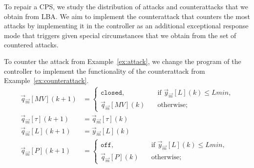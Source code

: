 {To repair a CPS, we study the distribution of attacks and counterattacks that we obtain from LBA. We aim to implement the counterattack that counters the most attacks by implementing it in the controller as an additional exceptional response mode that triggers given special circumstances that we obtain from the set of countered attacks. 
\begin{example}
  To counter the attack from Example~\ref{ex:attack}, we change the program of the controller to implement the functionality of the counterattack from Example~\ref{ex:counterattack}.
\begin{align}
  \label{eq:ControllerStage3Repair}
  \vec{q}_{\vec{m}}[MV](k+1)&=
  \begin{cases}
    \texttt{closed},&\quad \text{if $\vec{y}_{\vec{m}}[L](k)\leq Lmin$,}\\
    \vec{q}_{\vec{m}}[MV](k)&\quad \text{otherwise;}    
  \end{cases}\\
  \vec{q}_{\vec{m}}[\tau](k+1)&=\vec{q}_{\vec{m}}[\tau](k)\\
\vec{q}_{\vec{m}}[L](k+1)&=\vec{y}_{\vec{m}}[L](k)\\
\vec{q}_{\vec{m}}[P](k+1)&=\begin{cases}
  \texttt{off},&\quad \text{if $\vec{y}_{\vec{m}}[L](k)\leq Lmin$,}\\
  \vec{q}_{\vec{m}}[P](k)&\quad \text{otherwise;}    
\end{cases}
\end{align}
\end{example}


 
}
